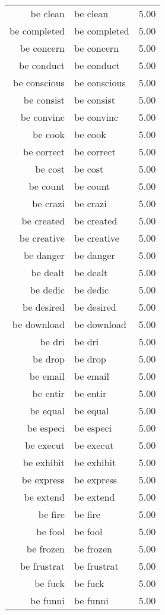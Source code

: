 \begin{table}[ht]
\begin{tabular}{rlr}
  be clean & be clean & 5.00 \\ 
  be completed & be completed & 5.00 \\ 
  be concern & be concern & 5.00 \\ 
  be conduct & be conduct & 5.00 \\ 
  be conscious & be conscious & 5.00 \\ 
  be consist & be consist & 5.00 \\ 
  be convinc & be convinc & 5.00 \\ 
  be cook & be cook & 5.00 \\ 
  be correct & be correct & 5.00 \\ 
  be cost & be cost & 5.00 \\ 
  be count & be count & 5.00 \\ 
  be crazi & be crazi & 5.00 \\ 
  be created & be created & 5.00 \\ 
  be creative & be creative & 5.00 \\ 
  be danger & be danger & 5.00 \\ 
  be dealt & be dealt & 5.00 \\ 
  be dedic & be dedic & 5.00 \\ 
  be desired & be desired & 5.00 \\ 
  be download & be download & 5.00 \\ 
  be dri & be dri & 5.00 \\ 
  be drop & be drop & 5.00 \\ 
  be email & be email & 5.00 \\ 
  be entir & be entir & 5.00 \\ 
  be equal & be equal & 5.00 \\ 
  be especi & be especi & 5.00 \\ 
  be execut & be execut & 5.00 \\ 
  be exhibit & be exhibit & 5.00 \\ 
  be express & be express & 5.00 \\ 
  be extend & be extend & 5.00 \\ 
  be fire & be fire & 5.00 \\ 
  be fool & be fool & 5.00 \\ 
  be frozen & be frozen & 5.00 \\ 
  be frustrat & be frustrat & 5.00 \\ 
  be fuck & be fuck & 5.00 \\ 
  be funni & be funni & 5.00 \\ 

\end{tabular}
\end{table}
